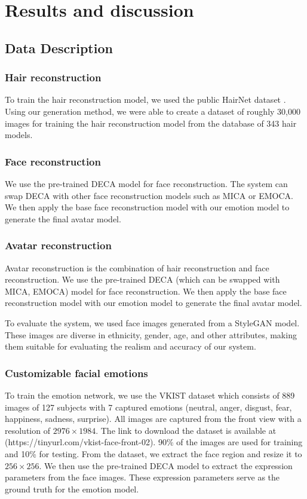 \section{Results and discussion}
\label{sec:results}

\subsection{Data Description}
\subsubsection{Hair reconstruction}
To train the hair reconstruction model, we used the public HairNet dataset \cite{zhouHairNetSingleViewHair2018}. Using our generation method, we were able to create a dataset of roughly 30,000 images for training the hair reconstruction model from the database of 343 hair models.

\subsubsection{Face reconstruction}
We use the pre-trained DECA model for face reconstruction. The system can swap DECA with other face reconstruction models such as MICA \cite{zielonkaMetricalReconstructionHuman2022} or EMOCA. We then apply the base face reconstruction model with our emotion model to generate the final avatar model.

\subsubsection{Avatar reconstruction}
Avatar reconstruction is the combination of hair reconstruction and face reconstruction. We use the pre-trained DECA (which can be swapped with MICA, EMOCA) model for face reconstruction. We then apply the base face reconstruction model with our emotion model to generate the final avatar model.

To evaluate the system, we used face images generated from a StyleGAN \cite{karrasStyleBasedGeneratorArchitecture2019} model. These images are diverse in ethnicity, gender, age, and other attributes, making them suitable for evaluating the realism and accuracy of our system.

\subsubsection{Customizable facial emotions}
To train the emotion network, we use the VKIST dataset which consists of 889 images of 127 subjects with 7 captured emotions (neutral, anger, disgust, fear, happiness, sadness, surprise). All images are captured from the front view with a resolution of $2976\times1984$. The link to download the dataset is available at (https://tinyurl.com/vkist-face-front-02). 90\% of the images are used for training and 10\% for testing. From the dataset, we extract the face region and resize it to $256\times256$. We then use the pre-trained DECA model to extract the expression parameters from the face images. These expression parameters serve as the ground truth for the emotion model.

